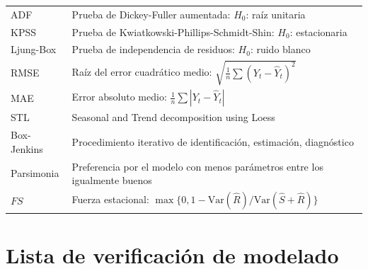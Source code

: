 \documentclass[12pt,a4paper]{article}
\theoremstyle{definition}
\begin{document}
\begin{longtable}{p{2.5cm}p{9cm}}
ADF & Prueba de Dickey-Fuller aumentada: $H_0$: raíz unitaria \\
KPSS & Prueba de Kwiatkowski-Phillips-Schmidt-Shin: $H_0$: estacionaria \\
Ljung-Box & Prueba de independencia de residuos: $H_0$: ruido blanco \\
RMSE & Raíz del error cuadrático medio: $\sqrt{\frac{1}{n}\sum(Y_t-\hat{Y}_t)^2}$ \\
MAE & Error absoluto medio: $\frac{1}{n}\sum|Y_t - \hat{Y}_t|$ \\
STL & Seasonal and Trend decomposition using Loess \\
Box-Jenkins & Procedimiento iterativo de identificación, estimación, diagnóstico \\
Parsimonia & Preferencia por el modelo con menos parámetros entre los igualmente buenos \\
$FS$ & Fuerza estacional: $\max\{0, 1 - \text{Var}(\hat{R})/\text{Var}(\hat{S}+\hat{R})\}$ \\
\bottomrule
\end{longtable}

\section{Lista de verificación de modelado}
\end{document}
